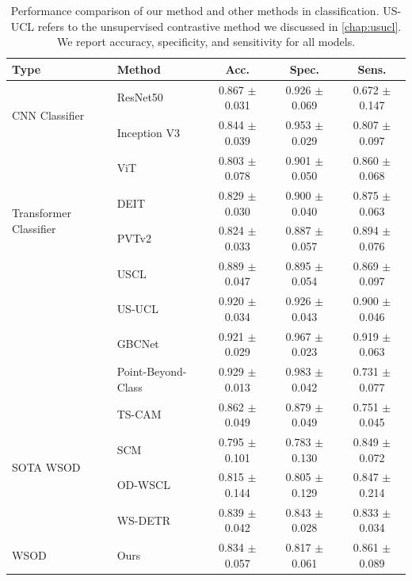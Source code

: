 \begin{table}[t]
	\centering
    \footnotesize
    \setlength{\tabcolsep}{6pt}
	\begin{tabular}{llccc}
		\toprule
		{\textbf{Type}} & {\textbf{Method}} & {\textbf{Acc.}} &  {\textbf{Spec.}} & {\textbf{Sens.}} \\
		\midrule
		\multirow{2}{*}{CNN Classifier} 
		& ResNet50 \cite{resnet} & 0.867 $\pm$ 0.031 & 0.926 $\pm$ 0.069 & 0.672 $\pm$ 0.147  \\
        & Inception V3 & 0.844 $\pm$ 0.039 & 0.953 $\pm$ 0.029 & 0.807 $\pm$ 0.097 \\
        \midrule
        \multirow{4}{*}{Transformer Classifier} 
        & ViT \cite{vit} & 0.803 $\pm$ 0.078 & 0.901 $\pm$ 0.050 & 0.860 $\pm$ 0.068  \\
		& DEIT \cite{touvron2021training} & 0.829 $\pm$ 0.030 & 0.900 $\pm$ 0.040 & 0.875 $\pm$ 0.063 \\
		& PVTv2 \cite{wang2021pvtv2} & 0.824 $\pm$ 0.033 & 0.887 $\pm$ 0.057 & 0.894 $\pm$ 0.076 \\
		\midrule
        \multirow{4}{*}{Additional Data/ Annotation}
		& USCL \cite{uscl} & 0.889 $\pm$ 0.047 & 0.895 $\pm$ 0.054 & 0.869 $\pm$ 0.097 \\
        & US-UCL \cite{basu2022unsupervised} & 0.920 $\pm$ 0.034 & 0.926 $\pm$ 0.043 & 0.900 $\pm$ 0.046  \\
		& GBCNet \cite{basu2022surpassing} & 0.921 $\pm$ 0.029 & 0.967 $\pm$ 0.023 & 0.919 $\pm$ 0.063 \\
        & Point-Beyond-Class \cite{pointdetr} & 0.929  $\pm$  0.013 & 0.983  $\pm$  0.042 & 0.731  $\pm$  0.077 \\
        \midrule
		\multirow{4}{*}{SOTA WSOD} &
		TS-CAM \cite{tscam} & 0.862 $\pm$ 0.049 & 0.879 $\pm$ 0.049 & 0.751 $\pm$ 0.045   \\
		& SCM \cite{scm} & 0.795 $\pm$ 0.101 & 0.783 $\pm$ 0.130 & 0.849 $\pm$ 0.072  \\
		& OD-WSCL \cite{odwscl} & 0.815 $\pm$ 0.144 & 0.805 $\pm$ 0.129 & 0.847 $\pm$ 0.214   \\
        & WS-DETR \cite{wsdetr} & 0.839 $\pm$ 0.042 & 0.843 $\pm$ 0.028 & 0.833 $\pm$ 0.034 \\
		\midrule%
		WSOD & Ours & 0.834 $\pm$ 0.057 & 0.817 $\pm$ 0.061 & 0.861 $\pm$ 0.089 \\
		\bottomrule
	\end{tabular}
    \caption[comparison of the proposed WSOD and other \sota methods in \gbc classification]{Performance comparison of our method and other \sota methods in \gbc classification. US-UCL refers to the unsupervised contrastive method we discussed in \cref{chap:usucl}. We report accuracy, specificity, and sensitivity for all models. }
	\label{wsod_tab:key_results}
\end{table}

